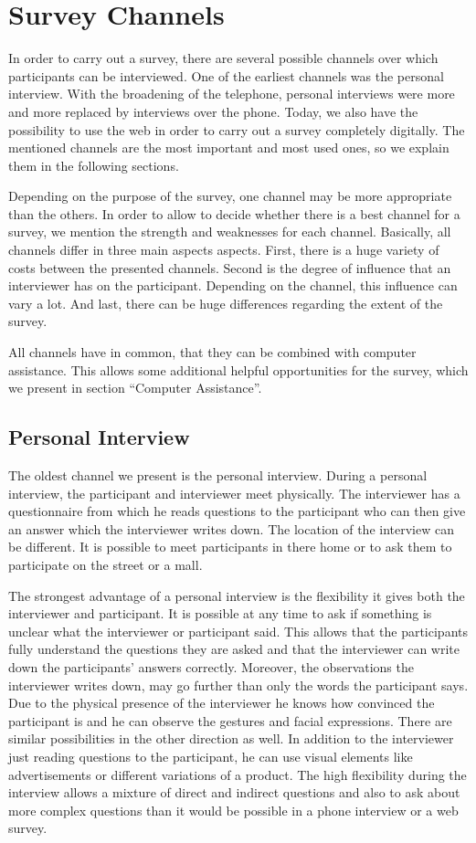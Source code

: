 \documentclass{article}
\begin{document}
\section{Survey Channels}
In order to carry out a survey, there are several possible channels over which participants can be interviewed. One of the earliest channels was the personal interview. With the broadening of the telephone, personal interviews were more and more replaced by interviews over the phone. Today, we also have the possibility to use the web in order to carry out a survey completely digitally. The mentioned channels are the most important and most used ones, so we explain them in the following sections.

Depending on the purpose of the survey, one channel may be more appropriate than the others. In order to allow to decide whether there is a best channel for a survey, we mention the strength and weaknesses for each channel. Basically, all channels differ in three main aspects aspects. First, there is a huge variety of costs between the presented channels. Second is the degree of influence that an interviewer has on the participant. Depending on the channel, this influence can vary a lot. And last, there can be huge differences regarding the extent of the survey.

All channels have in common, that they can be combined with computer assistance. This allows some additional helpful opportunities for the survey, which we present in section “Computer Assistance”.


\subsection{Personal Interview}

The oldest channel we present is the personal interview. During a personal interview, the participant and interviewer meet physically. The interviewer has a questionnaire from which he reads questions to the participant who can then give an answer which the interviewer writes down. The location of the interview can be different. It is possible to meet participants in there home or to ask them to participate on the street or a mall.

The strongest advantage of a personal interview is the flexibility it gives both the interviewer and participant. It is possible at any time to ask if something is unclear what the interviewer or participant said. This allows that the participants fully understand the questions they are asked and that the interviewer can write down the participants’ answers correctly. Moreover, the observations the interviewer writes down, may go further than only the words the participant says. Due to the physical presence of the interviewer he knows how convinced the participant is and he can observe the gestures and facial expressions. There are similar possibilities in the other direction as well. In addition to the interviewer just reading questions to the participant, he can use visual elements like advertisements or different variations of a product. The high flexibility during the interview allows a mixture of direct and indirect questions and also to ask about more complex questions than it would be possible in a phone interview or a web survey.
\end{document}
